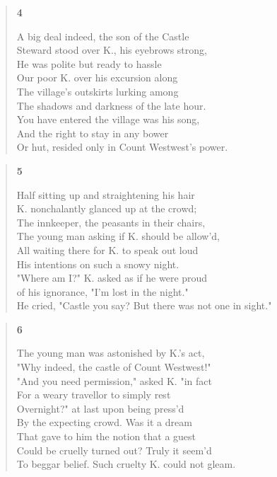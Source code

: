 \documentclass{article}
\begin{document}
\newpage
\begin{verse}
    \begin{center}
    \textbf{4} \\
  \end{center}
A big deal indeed, the son of the Castle \\
Steward stood over K., his eyebrows strong, \\
He was polite but ready to hassle \\
Our poor K. over his excursion along \\
The village's outskirts lurking among \\
The shadows and darkness of the late hour. \\
You have entered the village was his song, \\
And the right to stay in any bower \\
Or hut, resided only in Count Westwest's power.
\end{verse}
\begin{verse}
    \begin{center}
    \textbf{5} \\
  \end{center}
Half sitting up and straightening his hair \\
K. nonchalantly glanced up at the crowd;  \\
The innkeeper, the peasants in their chairs,  \\
The young man asking if K. should be allow'd, \\
All waiting there for K. to speak out loud \\
His intentions on such a snowy night. \\
"Where am I?" K. asked as if he were proud \\
of his ignorance,  "I'm lost in the night." \\
He cried, "Castle you say? But there was not one in sight."
\end{verse}
\begin{verse}
  \begin{center}
    \textbf{6} \\
  \end{center}
  The young man was astonished by K.'s act, \\
  "Why indeed, the castle of Count Westwest!" \\
  "And you need permission," asked K. "in fact \\
  For a weary travellor to simply rest \\
  Overnight?" at last upon being press'd \\
  By the expecting crowd. Was it a dream \\
  That gave to him the notion that a guest \\
  Could be cruelly turned out? Truly it seem'd \\
  To beggar belief. Such cruelty K. could not gleam.
\end{verse}
\end{document}
